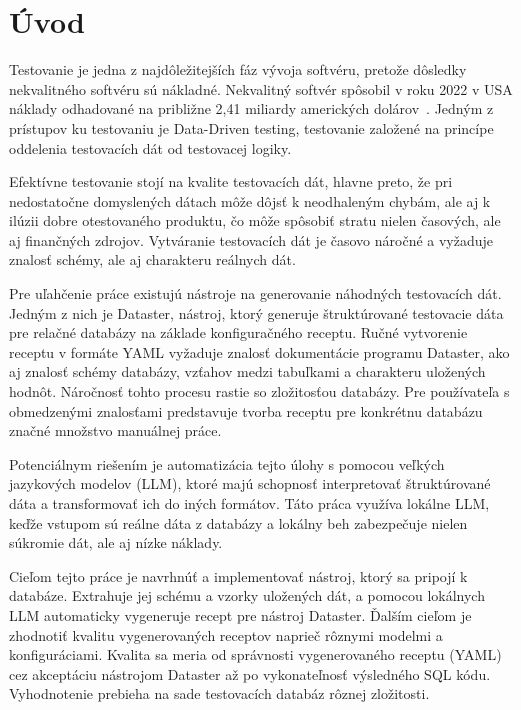 \chapter{Úvod}
\label{ch:kap1}
Testovanie je jedna z najdôležitejších fáz vývoja softvéru, pretože dôsledky nekvalitného softvéru sú nákladné. Nekvalitný softvér spôsobil v roku 2022 v USA náklady odhadované na približne 2,41 miliardy amerických dolárov~\cite{Krasner2022}. Jedným z prístupov ku testovaniu je Data-Driven testing, testovanie založené na princípe oddelenia testovacích dát od testovacej logiky.

Efektívne testovanie stojí na kvalite testovacích dát, hlavne preto, že pri nedostatočne domyslených dátach môže dôjsť k neodhaleným chybám, ale aj k ilúzii dobre otestovaného produktu, čo môže spôsobiť stratu nielen časových, ale aj finančných zdrojov.
Vytváranie testovacích dát je časovo náročné a vyžaduje znalosť schémy, ale aj charakteru reálnych dát.

Pre uľahčenie práce existujú nástroje na generovanie náhodných testovacích dát. Jedným z nich je Dataster, nástroj, ktorý generuje štruktúrované testovacie dáta pre relačné databázy na základe konfiguračného receptu. Ručné vytvorenie receptu v formáte YAML vyžaduje znalosť dokumentácie programu Dataster, ako aj znalosť schémy databázy, vzťahov medzi tabuľkami a charakteru uložených hodnôt. Náročnosť tohto procesu rastie so zložitosťou databázy. Pre používateľa s obmedzenými znalosťami predstavuje tvorba receptu pre konkrétnu databázu značné množstvo manuálnej práce.

Potenciálnym riešením je automatizácia tejto úlohy s pomocou veľkých jazykových modelov (LLM), ktoré majú schopnosť interpretovať štruktúrované dáta a transformovať ich do iných formátov. Táto práca využíva lokálne LLM, keďže vstupom sú reálne dáta z databázy a lokálny beh zabezpečuje nielen súkromie dát, ale aj nízke náklady.

Cieľom tejto práce je navrhnúť a implementovať nástroj, ktorý sa pripojí k databáze. Extrahuje jej schému a vzorky uložených dát, a pomocou lokálnych LLM automaticky vygeneruje recept pre nástroj Dataster. Ďalším cieľom je zhodnotiť kvalitu vygenerovaných receptov naprieč rôznymi modelmi a konfiguráciami. Kvalita sa meria od správnosti vygenerovaného receptu (YAML) cez akceptáciu nástrojom Dataster až po vykonateľnosť výsledného SQL kódu. Vyhodnotenie prebieha na sade testovacích databáz rôznej zložitosti.

